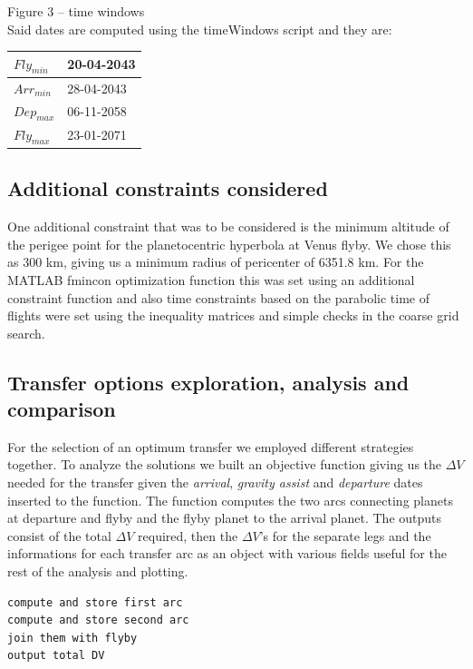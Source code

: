 \documentclass[11pt,a4paper]{report}
\begin{document}
Figure 3 – time windows\\
Said dates are computed using the timeWindows script and they are:

\begin{table}[H]
\centering
\begin{tabular}{|l|l|}
\hline
$Fly_{min}$ & 20-04-2043 \\ \hline
$Arr_{min}$ & 28-04-2043 \\ \hline
$Dep_{max}$ & 06-11-2058 \\ \hline
$Fly_{max}$ & 23-01-2071 \\ \hline
\end{tabular}
\end{table}

\subsection{Additional constraints considered}
One additional constraint that was to be considered is the minimum altitude of the perigee point for the planetocentric hyperbola at Venus flyby. We chose this as 300 km, giving us a minimum radius of pericenter of 6351.8 km. For the MATLAB fmincon optimization function this was set using an additional constraint function and also time constraints based on the parabolic time of flights were set using the inequality matrices and simple checks in the coarse grid search.

\subsection{Transfer options exploration, analysis and comparison}
For the selection of an optimum transfer we employed different strategies together.
To analyze the solutions we built an objective function giving us the $\Delta V$ needed for the transfer given the \emph{arrival}, \emph{gravity assist} and \emph{departure} dates inserted to the function. The function computes the two arcs connecting planets at departure and flyby and the flyby planet to the arrival planet. The outputs consist of the total $\Delta V$ required, then the $\Delta V$'s for the separate legs and the informations for each transfer arc as an object with various fields useful for the rest of the analysis and plotting.

\lstset{style=mystyle}
\begin{lstlisting}[frame=single,caption=GAtransfer objective function structure]  
compute and store first arc
compute and store second arc
join them with flyby
output total DV 
\end{lstlisting}
\end{document}
